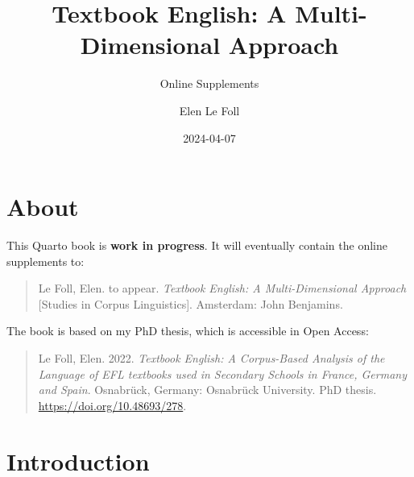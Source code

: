 \documentclass[
  letterpaper,
  DIV=11,
  numbers=noendperiod]{scrreprt}
\title{Textbook English: A Multi-Dimensional Approach}
\subtitle{Online Supplements}
\author{Elen Le Foll}
\date{2024-04-07}
\renewcommand*\contentsname{Table of contents}
\newcommand\contentsname{Table of contents}
\begin{document}
\maketitle

\renewcommand*\contentsname{Table of contents}
{
\hypersetup{linkcolor=}
\setcounter{tocdepth}{2}
\tableofcontents
}

\chapter*{About}\label{about}


\begin{tcolorbox}[enhanced jigsaw, titlerule=0mm, coltitle=black, breakable, title=\textcolor{quarto-callout-warning-color}{\faExclamationTriangle}\hspace{0.5em}{Warning}, left=2mm, arc=.35mm, toprule=.15mm, leftrule=.75mm, rightrule=.15mm, colframe=quarto-callout-warning-color-frame, colbacktitle=quarto-callout-warning-color!10!white, bottomtitle=1mm, toptitle=1mm, bottomrule=.15mm, colback=white, opacityback=0, opacitybacktitle=0.6]

This Quarto book is \textbf{work in progress}. It will eventually
contain the online supplements to:

\begin{quote}
Le Foll, Elen. to appear. \emph{Textbook English: A Multi-Dimensional
Approach} {[}Studies in Corpus Linguistics{]}. Amsterdam: John
Benjamins.
\end{quote}

\end{tcolorbox}

The book is based on my PhD thesis, which is accessible in Open Access:

\begin{quote}
Le Foll, Elen. 2022. \emph{Textbook English: A Corpus-Based Analysis of
the Language of EFL textbooks used in Secondary Schools in France,
Germany and Spain}. Osnabrück, Germany: Osnabrück University. PhD
thesis. \url{https://doi.org/10.48693/278}.
\end{quote}


\chapter{Introduction}\label{introduction}
\end{document}
